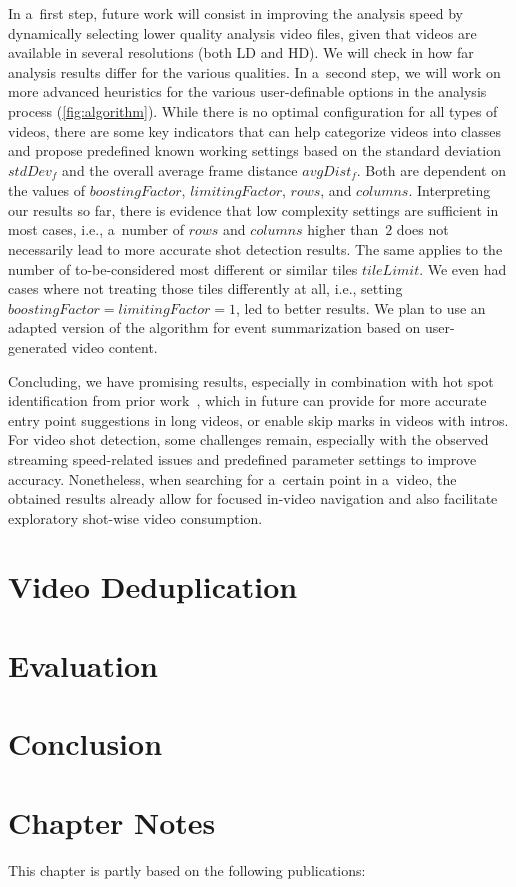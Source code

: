 In a~first step, future work will consist in improving the analysis speed by dynamically selecting lower quality analysis video files, given that videos are available in several resolutions (both LD and HD). We will check in how far analysis results differ for the various qualities. In a~second step, we will work on more advanced heuristics for the various user-definable options in the analysis process (\autoref{fig:algorithm}). While there is no optimal configuration for all types of videos, there are some key indicators that can help categorize videos into classes and propose predefined known working settings based on the standard deviation $\mathit{stdDev_{f}}$ and the overall average frame distance $\mathit{avgDist_{f}}$. Both are dependent on the values of $\mathit{boostingFactor}$, $\mathit{limitingFactor}$, $\mathit{rows}$, and $\mathit{columns}$. Interpreting our results so far, there is evidence that low complexity settings are sufficient in most cases, i.e., a~number of $\mathit{rows}$ and $\mathit{columns}$ higher than~$\mathit{2}$ does not necessarily lead to more accurate shot detection results. The same applies to the number of to-be-considered most different or similar tiles $\mathit{tileLimit}$. We even had cases where not treating those tiles differently at all, i.e., setting $\mathit{boostingFactor} = \mathit{limitingFactor} = \mathit{1}$, led to better results. We plan to use an adapted version of the algorithm for event summarization based on user-generated video content.

Concluding, we have promising results, especially in combination with hot spot identification from prior work~\cite{derive2011}, which in future can provide for more accurate entry point suggestions in long videos, or enable skip marks in videos with intros.
For video shot detection, some challenges remain, especially with the observed streaming speed-related issues and predefined parameter settings to improve accuracy. None\-theless, when searching for a~certain point in a~video, the obtained results already allow for focused in-video navigation and also facilitate exploratory shot-wise video consumption.

\section{Video Deduplication}

\section{Evaluation}

\section{Conclusion}

\section*{Chapter Notes}
This chapter is partly based on the following publications:

